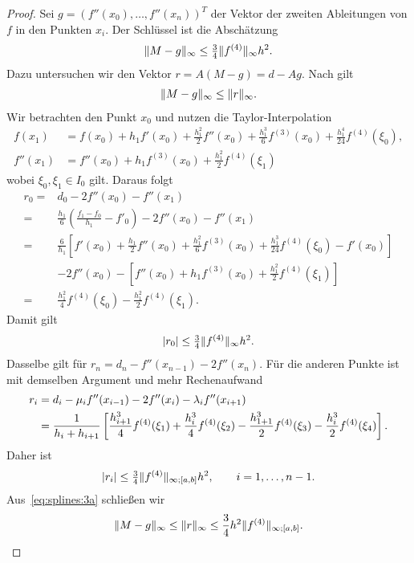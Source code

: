 \begin{proof}
  Sei $g = (f''(x_0),\dots,f''(x_n))^T$ der Vektor der zweiten
  Ableitungen von $f$ in den Punkten $x_i$. Der Schlüssel ist die
  Abschätzung
  \begin{gather}
    \lVert M-g\rVert_\infty \le \tfrac34 \lVert f^{(4)}\rVert_\infty h^2.
  \end{gather}
  Dazu untersuchen wir den Vektor $r = A(M-g) = d-Ag$. Nach
   gilt
  \begin{gather}
    \label{eq:splines:3a}
    \lVert M-g\rVert_\infty \le \lVert r\rVert_\infty.
  \end{gather}
  Wir betrachten den Punkt $x_0$ und nutzen die Taylor-Interpolation
  \begin{align}
    f(x_1) &= f(x_0) + h_1 f'(x_0) + \frac{h_1^2}{2} f''(x_0)
    + \frac{h_1^3}{6} f^{(3)}(x_0) + \frac{h_1^4}{24} f^{(4)}(\xi_0),\\
    f''(x_1) &= f''(x_0) + h_1 f^{(3)}(x_0)
                 + \frac{h_1^2}{2} f^{(4)}(\xi_1)
  \end{align}
  wobei $\xi_0,\xi_1\in I_0$ gilt. Daraus folgt
  \begin{align}
    r_0 =& d_0 - 2f''(x_0) - f''(x_1)\\
    =& \frac{h_1}6\left(\frac{f_1-f_0}{h_1} - f'_0\right)
       - 2f''(x_0) - f''(x_1)\\
    =& \frac{6}{h_1}\left[
      f'(x_0) + \frac{h_1}{2} f''(x_0)
    + \frac{h_1^2}{6} f^{(3)}(x_0) + \frac{h_1^3}{24} f^{(4)}(\xi_0)
      - f'(x_0)\right]\\
      &-2 f''(x_0) - \left[
        f''(x_0) + h_1 f^{(3)}(x_0) + \frac{h_1^2}{2} f^{(4)}(\xi_1)
        \right]\\
    =& \frac{h_1^2}{4} f^{(4)}(\xi_0) - \frac{h_1^2}{2} f^{(4)}(\xi_1).
  \end{align}
  Damit gilt
  \begin{gather}
    \lvert r_0\rvert \le \tfrac34 \lVert f^{(4)}\rVert_\infty h^2.
  \end{gather}
  Dasselbe gilt für $r_n = d_n - f''(x_{n-1}) - 2 f''(x_n)$. Für die
  anderen Punkte ist mit demselben Argument und mehr Rechenaufwand
  \begin{align}
    r_i &= d_i - \mu_i f''(x_{i-1}) - 2 f''(x_i) - \lambda_i f''(x_{i+1})
    \\\notag
    &= \frac1{h_i+h_{i+1}} \left[
      \frac{h_{i+1}^3}{4} f^{(4)}(\xi_1)
      +\frac{h_i^3}{4} f^{(4)}(\xi_2)
      -\frac{h_{1+1}^3}{2} f^{(4)}(\xi_3)
      -\frac{h_i^3}{2} f^{(4)}(\xi_4)
      \right].
  \end{align}
  Daher ist
  \begin{gather}
    \lvert r_i\rvert \le \tfrac34 \lVert f^{(4)}\rVert_{\infty;[a,b]} h^2,
    \qquad i=1,\dots,n-1.
  \end{gather}
  Aus~\eqref{eq:splines:3a} schließen wir
  \begin{gather}
    \label{eq:splines:3}
    \lVert M-g\rVert_{\infty} \le \lVert r\rVert_\infty
    \le \frac34 h^2\lVert f^{(4)}\rVert_{\infty;[a,b]}.
  \end{gather}
  

\end{proof}
